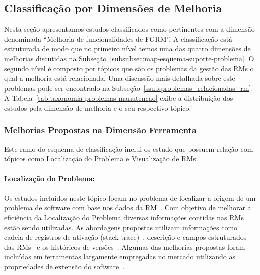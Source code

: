 \subsection{Classificação por Dimensões de Melhoria}
\label{sub:extensões_para_problemas_na_manutenção_de_software}

Nesta seção apresentamos estudos classificados como pertinentes com a dimensão
denominada ``Melhoria de funcionalidades de FGRM\@''. A classificação está
estruturada de modo que no primeiro nível temos uma das quatro dimensões de
melhorias discutidas na Subseção~\ref{subsubsec:map-esquema-suporte-problema}. O
segundo nível é composto por tópicos que são os problemas da gestão das RMs o
qual a melhoria está relacionada. Uma discussão mais detalhada sobre este
problemas pode ser encontrado na Subseção~\ref{ssub:problemas_relacionadas_rm}.
A Tabela~\ref{tab:taxonomia-problemas-manutencao} exibe a distribuição dos
estudos pela dimensão de melhoria e o seu respectivo tópico.




\subsubsection{Melhorias Propostas na Dimensão Ferramenta}
\label{ssub:melhorias_dim_ferramenta}

Este ramo do esquema de classificação inclui os estudo que possuem relação com
tópicos como Localização do Problema e Visualização de RMs.

\paragraph{Localização do Problema:} Os estudos incluídos neste tópico focam no
problema de localizar a origem de um problema de software com base nos dados da
RM~\cite{Hovemeyer:2004:FBE:1052883.1052895}. Com objetivo de melhorar a
eficiência da Localização do Problema diversas informações contidas nas RMs
estão sendo utilizadas. As abordagens propostas utilizam informações como cadeia
de registros de ativação (stack-trace)~\cite{Wong:2014:BBF:2705615.2706096},
des\-cri\-ção e campos estruturados das
RMs~\cite{Thung:2014:BIT:2635868.2661678} e os históricos de
versões~\cite{Bangcharoensap:2012:LSC:2419061.2419428, corley2011recovering,
	Romo:2015:TAT:2745802.2745833}. Algumas das melhorias propostas foram
incluídas em ferramentas largamente empregadas no mercado utilizando as
propriedades de extensão do
software~\cite{Thung:2014:BIT:2635868.2661678,corley2011recovering}.

